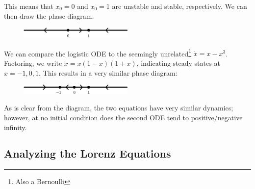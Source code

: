 \documentclass[12pt, oneside]{article}
\begin{document}
This means that $x_0 = 0$ and $x_0 = 1$ are unstable and stable, respectively. We can then draw the phase diagram:

\begin{figure}[h!]
  \centering
  \includegraphics*[width=0.5\textwidth]{figures/example1-1-2.png}
\end{figure}

We can compare the logistic ODE to the seemingly unrelated\footnote{Also a Bernoulli} $\dot{x} = x-x^3$. Factoring, we write $\dot{x} = x(1-x)(1+x)$, indicating steady states at $x = -1, 0, 1$. This results in a very similar phase diagram:

\begin{figure}[h!]
  \centering
  \includegraphics*[width=0.5\textwidth]{figures/example1-1-2a.png}
\end{figure}

As is clear from the diagram, the two equations have very similar dynamics; however, at no initial condition does the second ODE tend to positive/negative infinity.

\subsection{Analyzing the Lorenz Equations}
\end{document}
